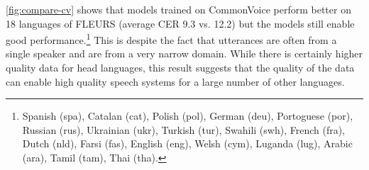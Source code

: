 \autoref{fig:compare-cv} shows that models trained on CommonVoice perform better on 18 languages of FLEURS (average CER 9.3 vs. 12.2) but the models \MMS{} still enable good performance.\footnote{Spanish (spa), Catalan (cat), Polish (pol), German (deu), Portoguese (por), Russian (rus), Ukrainian (ukr), Turkish (tur), Swahili (swh), French (fra), Dutch (nld), Farsi (fas), English (eng), Welsh (cym), Luganda (lug), Arabic (ara), Tamil (tam), Thai (tha).}
This is despite the fact that \MMS{} utterances are often from a single speaker and are from a very narrow domain.
While there is certainly higher quality data for head languages, this result suggests that the quality of the \MMS{} data can enable high quality speech systems for a large number of other languages.



